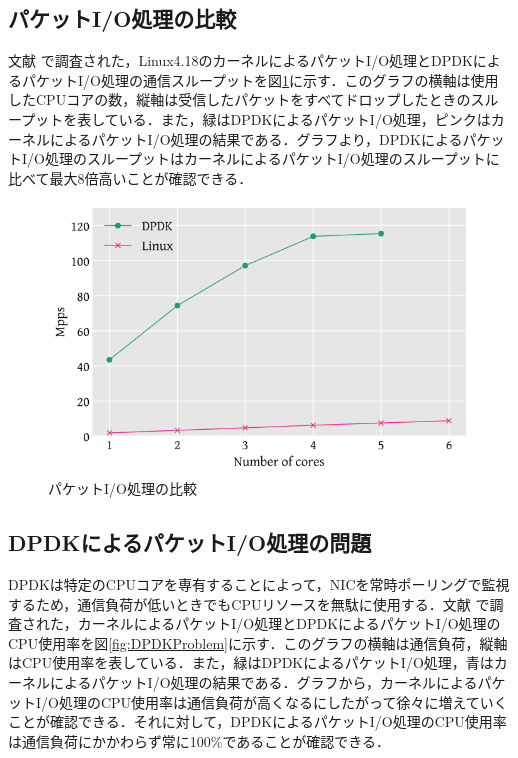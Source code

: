\subsection{パケットI/O処理の比較}
文献 \cite{XDP} で調査された，Linux4.18のカーネルによるパケットI/O処理とDPDKによるパケットI/O処理の通信スループットを図\ref{fig:PacketIOComparison}に示す．このグラフの横軸は使用したCPUコアの数，縦軸は受信したパケットをすべてドロップしたときのスループットを表している．また，緑はDPDKによるパケットI/O処理，ピンクはカーネルによるパケットI/O処理の結果である．グラフより，DPDKによるパケットI/O処理のスループットはカーネルによるパケットI/O処理のスループットに比べて最大8倍高いことが確認できる．

\begin{figure}[htb]
  \centering
  \includegraphics[width=\columnwidth]{pictures/PacketIOComparison.png}
  \caption{パケットI/O処理の比較}
  \label{fig:PacketIOComparison}
\end{figure}

\subsection{DPDKによるパケットI/O処理の問題}
DPDKは特定のCPUコアを専有することによって，NICを常時ポーリングで監視するため，通信負荷が低いときでもCPUリソースを無駄に使用する．文献 \cite{XDP} で調査された，カーネルによるパケットI/O処理とDPDKによるパケットI/O処理のCPU使用率を図\ref{fig:DPDKProblem}に示す．このグラフの横軸は通信負荷，縦軸はCPU使用率を表している．また，緑はDPDKによるパケットI/O処理，青はカーネルによるパケットI/O処理の結果である．グラフから，カーネルによるパケットI/O処理のCPU使用率は通信負荷が高くなるにしたがって徐々に増えていくことが確認できる．それに対して，DPDKによるパケットI/O処理のCPU使用率は通信負荷にかかわらず常に100\%であることが確認できる．

